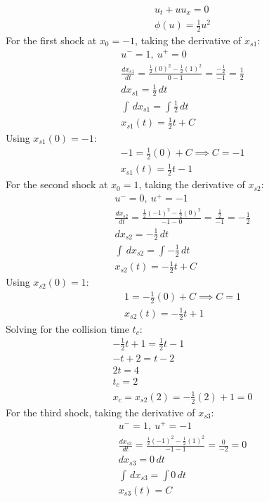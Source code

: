 \documentclass[letterpaper,11pt]{article}
\begin{document}
    \begin{gather*}
        u_t + u u_x = 0 \\
        \phi(u) = \frac{1}{2}u^2
    \end{gather*}
    For the first shock at $x_0 = -1$, taking the derivative of $x_{s1}$:
    \begin{gather*}
        u^- = 1,\ u^+ = 0 \\
        \frac{dx_{s1}}{dt} = \frac{\frac{1}{2}(0)^2 - \frac{1}{2}(1)^2}{0 - 1} = \frac{-\frac{1}{2}}{-1} = \frac{1}{2} \\
        dx_{s1} = \frac{1}{2} \,dt \\
        \int \,dx_{s1} = \int \frac{1}{2} \,dt \\
        x_{s1}(t) = \frac{1}{2}t + C
    \end{gather*}
    Using $x_{s1}(0) = -1$:
    \begin{gather*}
        -1 = \frac{1}{2}(0) + C \implies C = -1 \\
        x_{s1}(t) = \frac{1}{2}t - 1
    \end{gather*}
    For the second shock at $x_0 = 1$, taking the derivative of $x_{s2}$:
    \begin{gather*}
        u^- = 0,\ u^+ = -1 \\
        \frac{dx_{s2}}{dt} = \frac{\frac{1}{2}(-1)^2 - \frac{1}{2}(0)^2}{-1 - 0} = \frac{\frac{1}{2}}{-1} = -\frac{1}{2} \\
        dx_{s2} = -\frac{1}{2} \,dt \\
        \int \,dx_{s2} = \int -\frac{1}{2} \,dt \\
        x_{s2}(t) = -\frac{1}{2}t + C
    \end{gather*}
    Using $x_{s2}(0) = 1$:
    \begin{gather*}
        1 = -\frac{1}{2}(0) + C \implies C = 1 \\
        x_{s2}(t) = -\frac{1}{2}t + 1
    \end{gather*}
    Solving for the collision time $t_c$:
    \begin{gather*}
        -\frac{1}{2}t + 1 = \frac{1}{2}t - 1 \\
        -t + 2 = t - 2 \\
        2t = 4 \\
        t_c = 2 \\
        x_c = x_{s2}(2) = -\frac{1}{2}(2) + 1 = 0
    \end{gather*}
    For the third shock, taking the derivative of $x_{s3}$:
    \begin{gather*}
        u^- = 1,\ u^+ = -1 \\
        \frac{dx_{s3}}{dt} = \frac{\frac{1}{2}(-1)^2 - \frac{1}{2}(1)^2}{-1 - 1} = \frac{0}{-2} = 0 \\
        dx_{s3} = 0 \,dt \\
        \int \,dx_{s3} = \int 0 \,dt \\
        x_{s3}(t) = C
    \end{gather*}
\end{document}
